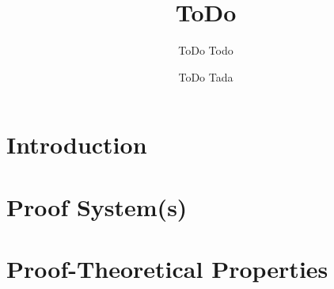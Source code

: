 \documentclass{llncs}
\title{ ToDo }
\author{
  ToDo Todo \inst{1} 
  \and 
  ToDo Tada \inst{2}
}
\institute{
  ToDo\\
  \email{ }
  \and 
  ToDo \\
  \email{ }
}
\begin{document}
\maketitle


\section{Introduction}





\section{Proof System(s)}






\section{Proof-Theoretical Properties}



\end{document}
